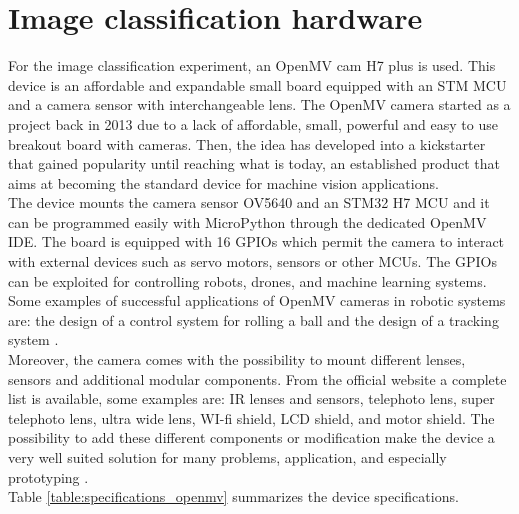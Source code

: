 \documentclass[12pt]{report}
\begin{document}
\section{Image classification hardware}
For the image classification experiment, an OpenMV cam H7 plus \cite{abdelkader2017openmv} \cite{openmv_web_page} is used. This device is an affordable and expandable small board equipped with an STM MCU and a camera sensor with interchangeable lens. The OpenMV camera started as a project \cite{openmv_project} back in 2013 due to a lack of affordable, small, powerful and easy to use breakout board with cameras. Then, the idea has developed into a kickstarter that gained popularity until reaching what is today, an established product that aims at becoming the standard device for machine vision applications. \\
The device mounts the camera sensor OV5640 and an STM32 H7 MCU and it can be programmed easily with MicroPython through the dedicated OpenMV IDE. The board is equipped with 16 GPIOs which permit the camera to interact with external devices such as servo motors, sensors or other MCUs. The GPIOs can be exploited for controlling robots, drones, and machine learning systems. Some examples of successful applications of OpenMV cameras in robotic systems are: the design of a control system for rolling a ball \cite{zhou2019design} and the design of a tracking system \cite{wei2020design}.\\
Moreover, the camera comes with the possibility to mount different lenses, sensors and additional modular components. From the official website a complete list is available, some examples are: IR lenses and sensors, telephoto lens, super telephoto lens, ultra wide lens, WI-fi shield, LCD shield, and motor shield.
The possibility to add these different components or modification make the device a very well suited solution for many problems, application, and especially prototyping .\\
Table \ref{table:specifications_openmv} summarizes the device specifications.\\
\end{document}
